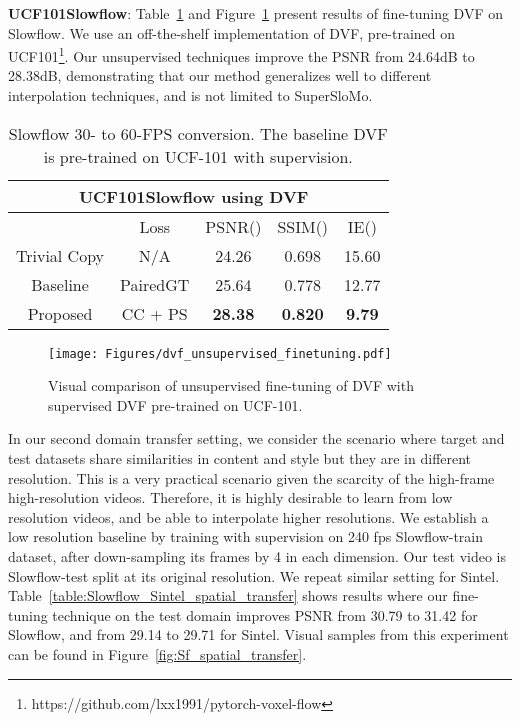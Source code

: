 \documentclass[10pt,twocolumn,letterpaper]{article}
\renewcommand{\textrightarrow}{}
\begin{document}
\noindent\textbf{UCF101\textrightarrow Slowflow}: Table~\ref{table:Slowflow_domain_transfer_for_DVF} and Figure~\ref{fig:Slowflow_domain_transfer_for_DVF} present results of fine-tuning DVF on Slowflow. We use an off-the-shelf implementation of DVF, pre-trained on UCF101\footnote{https://github.com/lxx1991/pytorch-voxel-flow}. Our unsupervised techniques improve the PSNR from 24.64dB to 28.38dB, demonstrating that our method generalizes well to different interpolation techniques, and is not limited to SuperSloMo.
\begin{table}[h!]
\small
\centering
\begin{tabular}{c c c  c  c  }
\hline
 \multicolumn{5}{c}{\textbf{UCF101}\textrightarrow \textbf{Slowflow} using DVF~\cite{liu2017video}} \\ 
\hline
 & Loss & PSNR()  & SSIM() & IE() \\ 
\hline
Trivial Copy  & N/A & 24.26  & 0.698  & 15.60 \\
Baseline & PairedGT & 25.64  & 0.778  & 12.77 \\
Proposed &  CC + PS & \textbf{28.38}  & \textbf{0.820}  & \textbf{9.79} \\
  \hline
\end{tabular}
\caption{Slowflow 30- to 60-FPS conversion. The baseline DVF is pre-trained on UCF-101 with supervision.}
\label{table:Slowflow_domain_transfer_for_DVF}
\end{table}

\begin{figure}[h!]
\begin{center}
   \texttt{[image: Figures/dvf\_unsupervised\_finetuning.pdf]}
\end{center}
\vspace{-0.5cm}
   \caption{Visual comparison of unsupervised fine-tuning of DVF with supervised DVF pre-trained on UCF-101.}
\label{fig:Slowflow_domain_transfer_for_DVF}
\end{figure}

In our second domain transfer setting, we consider the scenario where target and test datasets share similarities in content and style but they are in different resolution.
This is a very practical scenario given the scarcity of the high-frame high-resolution videos. Therefore, it is highly desirable to learn from low resolution videos, and be able to interpolate higher resolutions.
We establish a low resolution baseline by training with supervision on  240 fps Slowflow-train dataset, after down-sampling its frames by 4 in each dimension.
Our test video is Slowflow-test split at its original resolution. We repeat similar setting for Sintel. Table~\ref{table:Slowflow_Sintel_spatial_transfer} shows results where our fine-tuning technique on the test domain improves PSNR from 30.79 to 31.42 for Slowflow, and from 29.14 to 29.71 for Sintel.
Visual samples from this experiment can be found in Figure~\ref{fig:Sf_spatial_transfer}.
\end{document}
